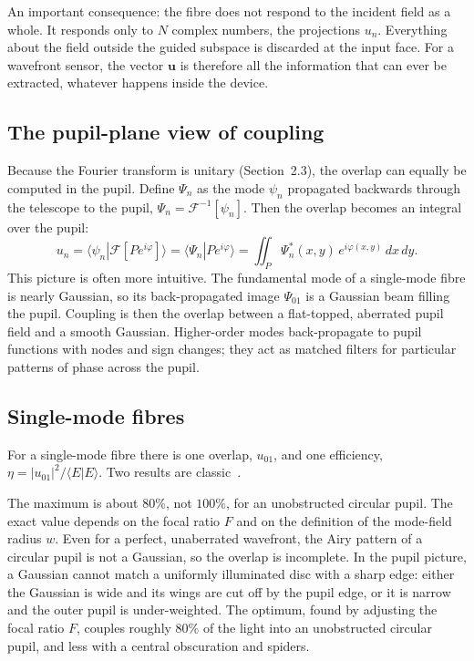 \documentclass[11pt,a4paper]{article}
\newcommand{\uvec}{\mathbf{u}}
\newcommand{\braket}[2]{\langle #1|#2\rangle}
\begin{document}
An important consequence: the fibre does not respond to the incident field as a whole. It responds only to $N$ complex numbers, the projections $u_n$. Everything about the field outside the guided subspace is discarded at the input face. For a wavefront sensor, the vector $\uvec$ is therefore all the information that can ever be extracted, whatever happens inside the device.

\subsection{The pupil-plane view of coupling}
Because the Fourier transform is unitary (Section~2.3), the overlap can equally be computed in the pupil. Define $\Psi_n$ as the mode $\psi_n$ propagated backwards through the telescope to the pupil, $\Psi_n = \mathcal{F}^{-1}[\psi_n]$. Then the overlap becomes an integral over the pupil:
\begin{equation}
u_n = \braket{\psi_n}{\mathcal{F}[P e^{i\varphi}]} = \braket{\Psi_n}{P e^{i\varphi}} = \iint_P \Psi_n^*(x,y)\, e^{i\varphi(x,y)}\, dx\, dy.
\label{eq:pupil_overlap}
\end{equation}
This picture is often more intuitive. The fundamental mode of a single-mode fibre is nearly Gaussian, so its back-propagated image $\Psi_{01}$ is a Gaussian beam filling the pupil. Coupling is then the overlap between a flat-topped, aberrated pupil field and a smooth Gaussian. Higher-order modes back-propagate to pupil functions with nodes and sign changes; they act as matched filters for particular patterns of phase across the pupil.

\subsection{Single-mode fibres}
For a single-mode fibre there is one overlap, $u_{01}$, and one efficiency, $\eta = |u_{01}|^2/\braket{E}{E}$. Two results are classic~\cite{ShaklanRoddier1988}.

The maximum is about $80\%$, not $100\%$, for an unobstructed circular pupil. The exact value depends on the focal ratio $F$ and on the definition of the mode-field radius $w$. Even for a perfect, unaberrated wavefront, the Airy pattern of a circular pupil is not a Gaussian, so the overlap is incomplete. In the pupil picture, a Gaussian cannot match a uniformly illuminated disc with a sharp edge: either the Gaussian is wide and its wings are cut off by the pupil edge, or it is narrow and the outer pupil is under-weighted. The optimum, found by adjusting the focal ratio $F$, couples roughly $80\%$ of the light into an unobstructed circular pupil, and less with a central obscuration and spiders.
\end{document}
